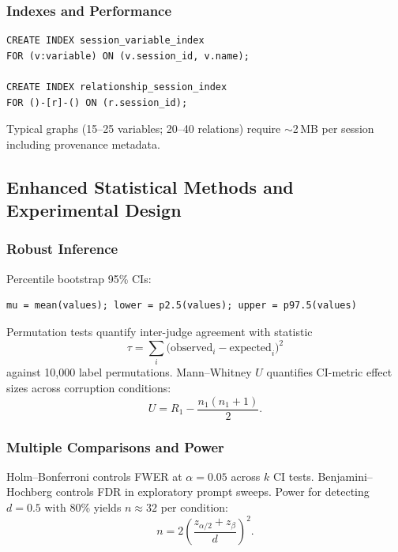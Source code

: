 
\subsubsection{Indexes and Performance}
\begin{verbatim}
CREATE INDEX session_variable_index
FOR (v:variable) ON (v.session_id, v.name);

CREATE INDEX relationship_session_index
FOR ()-[r]-() ON (r.session_id);
\end{verbatim}
Typical graphs (15--25 variables; 20--40 relations) require \(\sim\)2\,MB per session including provenance metadata.

\subsection{Enhanced Statistical Methods and Experimental Design}

\subsubsection{Robust Inference}
Percentile bootstrap 95\% CIs:
\begin{verbatim}
mu = mean(values); lower = p2.5(values); upper = p97.5(values)
\end{verbatim}
Permutation tests quantify inter-judge agreement with statistic
\[
\tau = \sum_i \bigl(\text{observed}_i - \text{expected}_i\bigr)^2
\]
against 10{,}000 label permutations. Mann--Whitney \(U\) quantifies CI-metric effect sizes across corruption conditions:
\[
U = R_1 - \frac{n_1(n_1+1)}{2}.
\]

\subsubsection{Multiple Comparisons and Power}
Holm--Bonferroni controls FWER at \(\alpha=0.05\) across \(k\) CI tests. Benjamini--Hochberg controls FDR in exploratory prompt sweeps. Power for detecting \(d=0.5\) with 80\% yields \(n \approx 32\) per condition:
\[
n = 2\left(\frac{z_{\alpha/2}+z_\beta}{d}\right)^2.
\]

